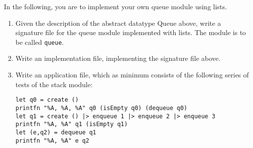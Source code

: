 In the following, you are to implement your own queue module using lists.
\begin{enumerate}
\item Given the description of the abstract datatype Queue above, write a signature file for the queue module implemented with lists. The module is to be called \lstinline{queue}.
\item Write an implementation file, implementing the signature file above.
\item Write an application file, which as minimum consists of the following series of tests of the stack module:
\begin{lstlisting}
let q0 = create ()
printfn "%A, %A, %A" q0 (isEmpty q0) (dequeue q0)
let q1 = create () |> enqueue 1 |> enqueue 2 |> enqueue 3
printfn "%A, %A" q1 (isEmpty q1)
let (e,q2) = dequeue q1
printfn "%A, %A" e q2
\end{lstlisting}
\end{enumerate}
